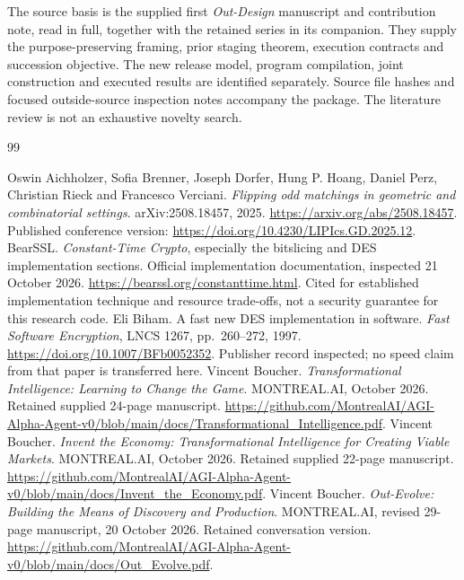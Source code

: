 \documentclass[11pt,letterpaper]{article}
\theoremstyle{definition}\newtheorem{definition}[theorem]{Definition}
\theoremstyle{remark}\newtheorem{remark}[theorem]{Remark}
\begin{document}
The source basis is the supplied first \emph{Out-Design} manuscript and contribution note, read in full, together with the retained series in its companion. They supply the purpose-preserving framing, prior staging theorem, execution contracts and succession objective. The new release model, program compilation, joint construction and executed results are identified separately. Source file hashes and focused outside-source inspection notes accompany the package. The literature review is not an exhaustive novelty search.

\clearpage
\begin{thebibliography}{99}
\small\raggedright\setlength{\itemsep}{.35em}
Oswin Aichholzer, Sofia Brenner, Joseph Dorfer, Hung P. Hoang, Daniel Perz, Christian Rieck and Francesco Verciani. \emph{Flipping odd matchings in geometric and combinatorial settings}. arXiv:2508.18457, 2025. \url{https://arxiv.org/abs/2508.18457}. Published conference version: \url{https://doi.org/10.4230/LIPIcs.GD.2025.12}.
BearSSL. \emph{Constant-Time Crypto}, especially the bitslicing and DES implementation sections. Official implementation documentation, inspected 21 October 2026. \url{https://bearssl.org/constanttime.html}. Cited for established implementation technique and resource trade-offs, not a security guarantee for this research code.
Eli Biham. A fast new DES implementation in software. \emph{Fast Software Encryption}, LNCS 1267, pp.~260--272, 1997. \url{https://doi.org/10.1007/BFb0052352}. Publisher record inspected; no speed claim from that paper is transferred here.
Vincent Boucher. \emph{Transformational Intelligence: Learning to Change the Game}. MONTREAL.AI, October 2026. Retained supplied 24-page manuscript. \url{https://github.com/MontrealAI/AGI-Alpha-Agent-v0/blob/main/docs/Transformational_Intelligence.pdf}.
Vincent Boucher. \emph{Invent the Economy: Transformational Intelligence for Creating Viable Markets}. MONTREAL.AI, October 2026. Retained supplied 22-page manuscript. \url{https://github.com/MontrealAI/AGI-Alpha-Agent-v0/blob/main/docs/Invent_the_Economy.pdf}.
Vincent Boucher. \emph{Out-Evolve: Building the Means of Discovery and Production}. MONTREAL.AI, revised 29-page manuscript, 20 October 2026. Retained conversation version. \url{https://github.com/MontrealAI/AGI-Alpha-Agent-v0/blob/main/docs/Out_Evolve.pdf}.

\end{thebibliography}
\end{document}
